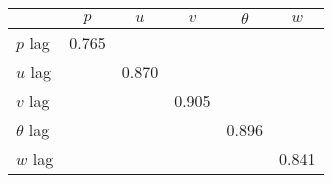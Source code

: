 \begin{tabular}{l*{5}{c}}
\toprule
                &\multicolumn{1}{c}{$ p $}&\multicolumn{1}{c}{$ u $}&\multicolumn{1}{c}{$ v $}&\multicolumn{1}{c}{$ \theta $}&\multicolumn{1}{c}{$ w $}\\
\midrule
$ p $ lag       &    0.765&         &         &         &         \\
$ u $ lag       &         &    0.870&         &         &         \\
$ v $ lag       &         &         &    0.905&         &         \\
$ \theta $ lag  &         &         &         &    0.896&         \\
$ w $ lag       &         &         &         &         &    0.841\\
\bottomrule
\end{tabular}
